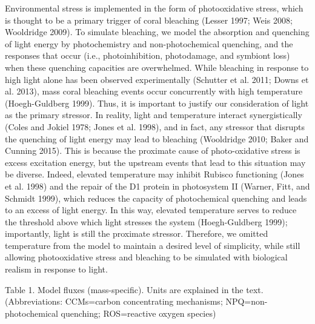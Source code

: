 \documentclass[]{elsarticle} %
\begin{document}
Environmental stress is implemented in the form of photooxidative
stress, which is thought to be a primary trigger of coral bleaching
(Lesser 1997; Weis 2008; Wooldridge 2009). To simulate bleaching, we
model the absorption and quenching of light energy by photochemistry and
non-photochemical quenching, and the responses that occur (i.e.,
photoinhibition, photodamage, and symbiont loss) when these quenching
capacities are overwhelmed. While bleaching in response to high light
alone has been observed experimentally (Schutter et al. 2011; Downs et
al. 2013), mass coral bleaching events occur concurrently with high
temperature (Hoegh-Guldberg 1999). Thus, it is important to justify our
consideration of light as the primary stressor. In reality, light and
temperature interact synergistically (Coles and Jokiel 1978; Jones et
al. 1998), and in fact, any stressor that disrupts the quenching of
light energy may lead to bleaching (Wooldridge 2010; Baker and Cunning
2015). This is because the proximate cause of photo-oxidative stress is
excess excitation energy, but the upstream events that lead to this
situation may be diverse. Indeed, elevated temperature may inhibit
Rubisco functioning (Jones et al. 1998) and the repair of the D1 protein
in photosystem II (Warner, Fitt, and Schmidt 1999), which reduces the
capacity of photochemical quenching and leads to an excess of light
energy. In this way, elevated temperature serves to reduce the threshold
above which light stresses the system (Hoegh-Guldberg 1999);
importantly, light is still the proximate stressor. Therefore, we
omitted temperature from the model to maintain a desired level of
simplicity, while still allowing photooxidative stress and bleaching to
be simulated with biological realism in response to light.

Table 1. Model fluxes (mass-specific). Units are explained in the text.
(Abbreviations: CCMs=carbon concentrating mechanisms;
NPQ=non-photochemical quenching; ROS=reactive oxygen species)
\end{document}
